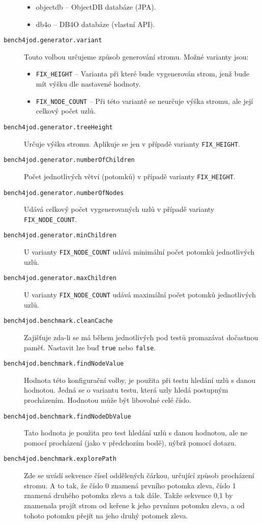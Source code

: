 \begin{description}
\begin{itemize}
     \item objectdb -- ObjectDB databáze (JPA).
     \item db4o -- DB4O databáze (vlastní API).
   \end{itemize}
   \item[\texttt{bench4jod.generator.variant}] Touto volbou určujeme způsob generování stromu. Možné varianty jsou:
   \begin{itemize}
     \item \texttt{FIX\_HEIGHT} -- Varianta při které bude vygenerován strom, jenž bude mít výšku dle nastavené hodnoty.
     \item \texttt{FIX\_NODE\_COUNT} -- Při této variantě se neurčuje výška stromu, ale její celkový počet uzlů.
   \end{itemize}
   \item[\texttt{bench4jod.generator.treeHeight}] Určuje výšku stromu. Aplikuje se jen v případě varianty \texttt{FIX\_HEIGHT}.
   \item[\texttt{bench4jod.generator.numberOfChildren}] Počet jednotlivých větví (potomků) v případě varianty \texttt{FIX\_HEIGHT}.
   \item[\texttt{bench4jod.generator.numberOfNodes}] Udává celkový počet vygenerovaných uzlů v případě varianty \texttt{FIX\_NODE\_COUNT}.
   \item[\texttt{bench4jod.generator.minChildren}] U varianty \texttt{FIX\_NODE\_COUNT} udává minimální počet potomků jednotlivých uzlů.
   \item[\texttt{bench4jod.generator.maxChildren}] U varianty \texttt{FIX\_NODE\_COUNT} udává maximální počet potomků jednotlivých uzlů.
   \item[\texttt{bench4jod.benchmark.cleanCache}] Zajišťuje zda-li se má během jednotlivých pod testů promazávat dočastnou paměť. Nastavit lze buď \texttt{true} nebo \texttt{false}.
   \item[\texttt{bench4jod.benchmark.findNodeValue}] Hodnota této konfigurační volby, je použita při testu hledání uzlů s danou hodnotou. Jedná se o variantu testu, která uzly hledá postupným procházením. Hodnotou může být libovolné celé číslo.
   \item[\texttt{bench4jod.benchmark.findNodeDbValue}] Tato hodnota je použita pro test hledání uzlů s danou hodnotou, ale ne pomocí procházení (jako v předchozím bodě), nýbrž pomocí dotazu.
   \item[\texttt{bench4jod.benchmark.explorePath}] Zde se uvádí sekvence čísel oddělených čárkou, určující způsob procházení stromu. A to tak, že číslo 0 znamená prvního potomka zleva, číslo 1 znamená druhého potomka zleva a tak dále. Takže sekvence 0,1 by znamenala projít strom od keřene k jeho prvnímu potomku zleva, a od tohoto potomku přejít na jeho druhý potomek zleva.
\end{description}
